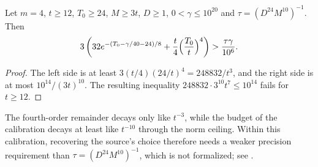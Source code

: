 \begin{lemma}
    \label{lem:soft_fourth_order_budget}
    \leanok
    Let $m=4$, $t\geq12$, $T_0\geq24$, $M\geq3t$, $D\geq1$, $0<\gamma\leq10^{20}$
    and $\tau=(D^{24}M^{10})^{-1}$. Then
    \begin{align}
        3\left(32e^{-(T_0-\gamma/40-24)/8}+\frac t4\Bigl(\frac{T_0}{t}\Bigr)^4\right)
        >\frac{\tau\gamma}{10^6}.
    \end{align}
\end{lemma}
\begin{proof}\leanok
    The left side is at least $3(t/4)(24/t)^4=248832/t^3$, and the right side
    is at most $10^{14}/(3t)^{10}$. The resulting inequality
    $248832\cdot3^{10}t^7\leq10^{14}$ fails for $t\geq12$.
\end{proof}

The fourth-order remainder decays only like $t^{-3}$, while the budget of the
calibration decays at least like $t^{-10}$ through the norm ceiling. Within this
calibration, recovering the source's choice therefore needs a weaker precision
requirement than $\tau=(D^{24}M^{10})^{-1}$, which is not formalized; see
\cite{gap:alvv16_soft_regional_residuals}.
